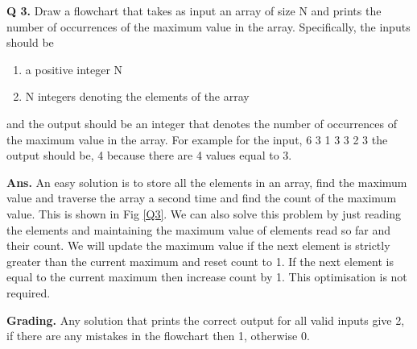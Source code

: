 \documentclass{article}
\begin{document}
\begin{flushleft}

    \textbf{Q 3. } Draw a flowchart that takes as input an array of size N
    and prints the number of occurrences of the maximum value in the array. 
    Specifically, the inputs should be
    \begin{enumerate}
    \item  a positive integer N
    \item  N integers denoting the elements of the array
    \end{enumerate}
and the output should be an integer that denotes the number of occurrences of the maximum value in the array.
For example for the input,
   6
   3 1 3 3 2 3
the output should be,
   4
because there are 4 values equal to 3.
    
    \end{flushleft}
    
    \begin{flushleft}
    
    \textbf{Ans. } An easy solution is to store all the elements in an array, 
    find the maximum value and traverse the array a second time and find the 
    count of the maximum value. This is shown in Fig \ref{Q3}.
    We can also solve this problem by just reading the elements and maintaining the 
    maximum value of elements read so far and their count. We will update the maximum 
    value if the next element is strictly greater than the current maximum and reset count to 1.
    If the next element is equal to the current maximum then increase count by 1.
    This optimisation is not required.
    
    \end{flushleft}
    
    \begin{flushleft}
    
    \textbf{Grading. } Any solution that prints the correct output for all valid inputs give 2, if there 
    are any mistakes in the flowchart then 1, otherwise 0.
    
    \end{flushleft}
    
\end{document}
